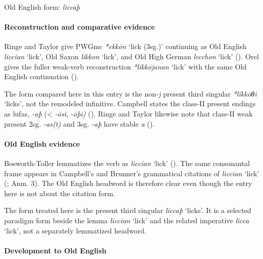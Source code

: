 \documentclass[
  british,
  a4paper,
]{article}
\providecommand{\Recon}[1]{\emph{*#1}}
\begin{document}
Old English form: \emph{liccaþ}

\paragraph{Reconstruction and comparative
evidence}\label{reconstruction-and-comparative-evidence-141}

Ringe and Taylor give PWGmc \Recon{ekkōn} `lick (3sg.)' continuing as
Old English {\emph{liccian}} `lick', Old Saxon {\emph{likkon}} `lick',
and Old High German {\emph{lecchon}} `lick'
(). Orel gives
the fuller weak-verb reconstruction \Recon{likkōjanan} `lick' with the
same Old English continuation ().

The form compared here in this entry is the non-\emph{j} present third
singular \Recon{líkkōθi} `licks', not the remodeled infinitive. Campbell
states the class-II present endings as lufas, \emph{-aþ} (\textless{}
\emph{-ōsi}, \emph{-ōþi)} (). Ringe and Taylor likewise note that class-II weak present
2sg. \emph{-as(t)} and 3sg. \emph{-aþ} have stable \emph{a}
().

\paragraph{Old English evidence}\label{old-english-evidence-141}

Bosworth-Toller lemmatizes the verb as \emph{liccian} `lick'
(). The
same consonantal frame appears in Campbell's and Brunner's grammatical
citations of \emph{liccian} `lick' (;  Anm. 3). The Old English headword is therefore clear even
though the entry here is not about the citation form.

The form treated here is the present third singular {\emph{liccaþ}}
`licks'. It is a selected paradigm form beside the lemma
{\emph{liccian}} `lick' and the related imperative {\emph{licca}}
`lick', not a separately lemmatized headword.

\paragraph{Development to Old
English}\label{development-to-old-english-141}
\end{document}
